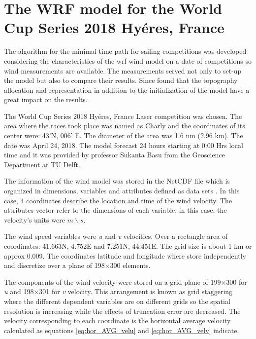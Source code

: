 \section{The WRF model for the World Cup Series 2018 Hyéres, France}

The algorithm for the minimal time path for sailing competitions was developed considering the characteristics of the \acrshort{wrf} wind model on a date of competitions so wind measurements are available. The measurements served not only to set-up the model but also to compare their results. Since \cite{giannaros2018ultrahigh} found that the topography allocation and representation in addition to the initialization of the model have a great impact on the results. \par

The World Cup Series 2018 Hyéres, France Laser competition was chosen. The area where the races took place was named as Charly and the coordinates of its center were: 43'N, 006' E. The diameter of the area was 1.6 nm (2.96 km). The date was April 24, 2018. The model forecast 24 hours starting at 0:00 Hrs local time and it was provided by professor Sukanta Basu from the Geoscience Department at TU Delft. \par 

The information of the wind model was stored in the NetCDF file which is organized in dimensions, variables and attributes defined as data sets \cite{netcdf56302}. In this case, 4 coordinates describe the location and time of %
the wind velocity. The attributes vector refer to the dimensions of each variable, in this case, the velocity's units were $m \backslash s $. \par 

The wind speed variables were \textit{u} and \textit{v} velocities. Over a rectangle area of coordinates: 41.663\degree N, 4.752\degree E and 7.251\degree N, 44.451\degree E. The grid size is about 1 km or approx 0.009\degree. The coordinates latitude and longitude where store independently and discretize over a plane of 198$\times$300 elements. \par 
The components of the wind velocity were stored on a grid plane of 199$\times$300 for \textit{u} and 198$\times$301 for \textit{v} velocity. This arrangement is known as grid staggering where the different dependent variables are on different grids so the spatial resolution is increasing while the effects of truncation error are decreased. The velocity corresponding to each coordinate is the horizontal average velocity calculated as equations \ref{eq:hor_AVG_velu} and \ref{eq:hor_AVG_velv} indicate.  \par  %

